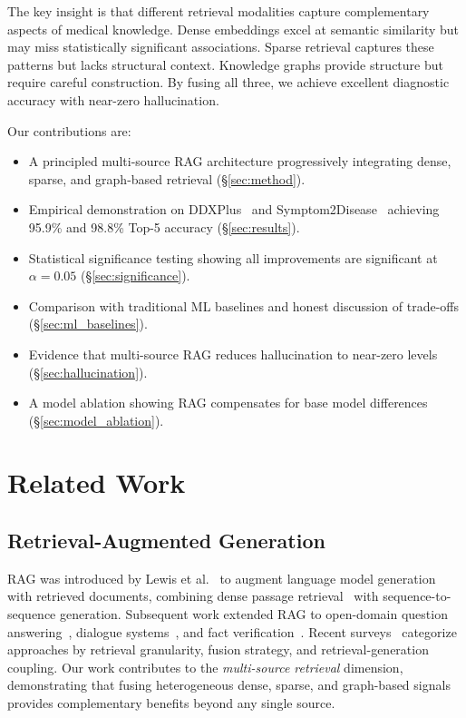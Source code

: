\documentclass[preprint,12pt]{elsarticle}
\begin{document}
The key insight is that different retrieval modalities capture complementary aspects of medical knowledge. Dense embeddings excel at semantic similarity but may miss statistically significant associations. Sparse retrieval captures these patterns but lacks structural context. Knowledge graphs provide structure but require careful construction. By fusing all three, we achieve excellent diagnostic accuracy with near-zero hallucination.

Our contributions are:
\begin{itemize}
    \item A principled multi-source RAG architecture progressively integrating dense, sparse, and graph-based retrieval (\S\ref{sec:method}).
    \item Empirical demonstration on DDXPlus~\cite{fansi2022ddxplus} and Symptom2Disease~\cite{gretelai_s2d} achieving 95.9\% and 98.8\% Top-5 accuracy (\S\ref{sec:results}).
    \item Statistical significance testing showing all improvements are significant at $\alpha=0.05$ (\S\ref{sec:significance}).
    \item Comparison with traditional ML baselines and honest discussion of trade-offs (\S\ref{sec:ml_baselines}).
    \item Evidence that multi-source RAG reduces hallucination to near-zero levels (\S\ref{sec:hallucination}).
    \item A model ablation showing RAG compensates for base model differences (\S\ref{sec:model_ablation}).
\end{itemize}

\section{Related Work}
\label{sec:related}

\subsection{Retrieval-Augmented Generation}

RAG was introduced by Lewis et al.~\cite{lewis2020retrieval} to augment language model generation with retrieved documents, combining dense passage retrieval~\cite{karpukhin2020dense} with sequence-to-sequence generation. Subsequent work extended RAG to open-domain question answering~\cite{izacard2021leveraging}, dialogue systems~\cite{shuster2021retrieval}, and fact verification~\cite{thorne2018fever}. Recent surveys~\cite{gao2023retrieval,zhao2024retrieval} categorize approaches by retrieval granularity, fusion strategy, and retrieval-generation coupling. Our work contributes to the \emph{multi-source retrieval} dimension, demonstrating that fusing heterogeneous dense, sparse, and graph-based signals provides complementary benefits beyond any single source.
\end{document}
